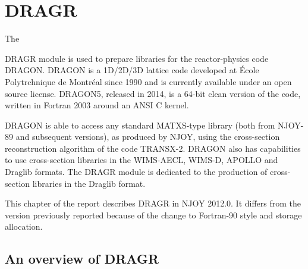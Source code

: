 \section{DRAGR}
\label{sDRAGR}

\hypertarget{sDRAGRhy}{The}
DRAGR module is used to prepare libraries for the
reactor-physics code DRAGON\cite{PIP2009,dragon}.
DRAGON is a 1D/2D/3D lattice code developed at \'Ecole Polytrchnique de
Montr\'eal since 1990 and is currently available under an open source
license. DRAGON5, released in 2014, is a 64-bit clean version of the
code, written in Fortran 2003 around an ANSI C kernel\cite{dragon5}.

DRAGON is able to access any standard MATXS-type library (both from NJOY-89
and subsequent versions), as produced by NJOY, using the cross-section
reconstruction algorithm of the code TRANSX-2\cite{TRANSX2}. DRAGON also
has capabilities to use cross-section libraries in the WIMS-AECL, WIMS-D,
APOLLO and Draglib formats. The DRAGR module is dedicated to the production
of cross-section libraries in the Draglib format.

This chapter of the report describes DRAGR in NJOY 2012.0.
It differs from the version previously reported
because of the change to Fortran-90 style and storage allocation.

\subsection{An overview of DRAGR}\label{sect:dragr}


